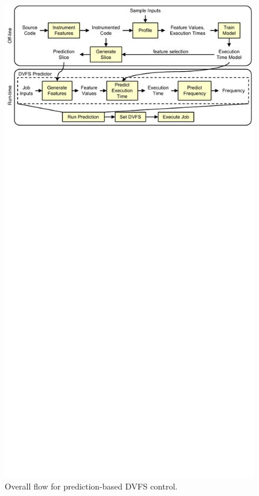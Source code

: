 \begin{figure}
  \begin{center}
    \includegraphics{exec_time_prediction/figs/high_level_flow.pdf}
    \caption{Overall flow for prediction-based DVFS control.}
    \label{fig:exec_time_prediction.system.high_level_flow}
  \end{center}
\end{figure}

